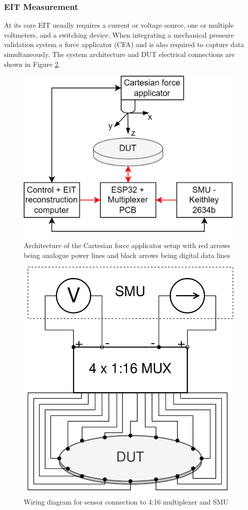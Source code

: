 \subsubsection{EIT Measurement}\label{sec:EIT Measurement}
At its core EIT usually requires a current or voltage source, one or multiple voltmeters, and a switching device. When integrating a mechanical pressure validation system a  force applicator (CFA) and is also required to capture data simultaneously. The system architecture and DUT electrical connections are shown in Figure \ref{fig:wiring_ERT_sensor}. 
\begin{figure}[H]
    \centering
    \includegraphics[width=0.6\linewidth]{Figures/ERT_MUX_CFA_architecture.jpg}
    \caption{Architecture of the Cartesian force applicator setup with red arrows being analogue power lines and black arrows being digital data lines}
    \label{fig:eit_sensor_architecture}
\end{figure}
\begin{figure}[H]
    \centering
    \includegraphics[width=0.35\linewidth]{Figures/wiring_diagram_ERT_sensor.jpg}
    \caption{Wiring diagram for sensor connection to 4:16 multiplexer and SMU}
    \label{fig:wiring_ERT_sensor}
\end{figure} 

